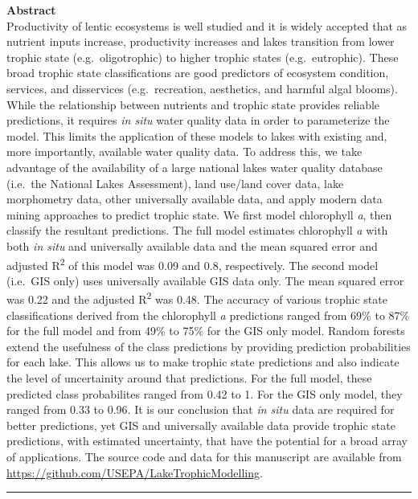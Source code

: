 \documentclass[11pt,]{article}
\begin{document}
\textbf{Abstract}\\Productivity of lentic ecosystems is well studied and
it is widely accepted that as nutrient inputs increase, productivity
increases and lakes transition from lower trophic state
(e.g.~oligotrophic) to higher trophic states (e.g.~eutrophic). These
broad trophic state classifications are good predictors of ecosystem
condition, services, and disservices (e.g.~recreation, aesthetics, and
harmful algal blooms). While the relationship between nutrients and
trophic state provides reliable predictions, it requires \emph{in situ}
water quality data in order to parameterize the model. This limits the
application of these models to lakes with existing and, more
importantly, available water quality data. To address this, we take
advantage of the availability of a large national lakes water quality
database (i.e.~the National Lakes Assessment), land use/land cover data,
lake morphometry data, other universally available data, and apply
modern data mining approaches to predict trophic state. We first model
chlorophyll \emph{a}, then classify the resultant predictions. The full
model estimates chlorophyll \emph{a} with both \emph{in situ} and
universally available data and the mean squared error and adjusted
R\textsuperscript{2} of this model was 0.09 and 0.8, respectively. The
second model (i.e.~GIS only) uses universally available GIS data only.
The mean squared error was 0.22 and the adjusted R\textsuperscript{2}
was 0.48. The accuracy of various trophic state classifications derived
from the chlorophyll \emph{a} predictions ranged from 69\% to 87\% for
the full model and from 49\% to 75\% for the GIS only model. Random
forests extend the usefulness of the class predictions by providing
prediction probabilities for each lake. This allows us to make trophic
state predictions and also indicate the level of uncertainity around
that predictions. For the full model, these predicted class probabilites
ranged from 0.42 to 1. For the GIS only model, they ranged from 0.33 to
0.96. It is our conclusion that \emph{in situ} data are required for
better predictions, yet GIS and universally available data provide
trophic state predictions, with estimated uncertainty, that have the
potential for a broad array of applications. The source code and data
for this manuscript are available from
\url{https://github.com/USEPA/LakeTrophicModelling}.

\vspace{3mm}

\hrule

\doublespace
\end{document}
